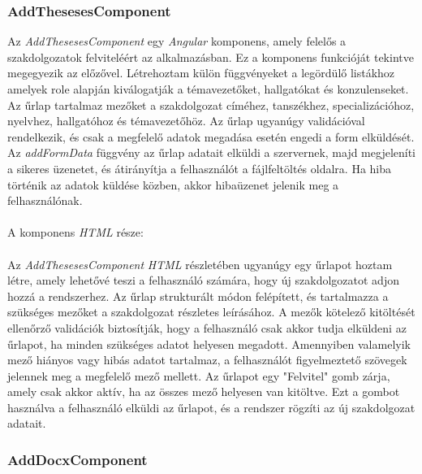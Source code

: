 \subsubsection{AddThesesesComponent}

Az \textit{AddThesesesComponent} egy \textit{Angular} komponens, amely felelős a szakdolgozatok felviteléért az alkalmazásban. Ez a komponens funkcióját tekintve megegyezik az előzővel. Létrehoztam külön függvényeket a legördülő listákhoz amelyek role alapján kiválogatják a témavezetőket, hallgatókat és konzulenseket.  Az űrlap tartalmaz mezőket a szakdolgozat címéhez, tanszékhez, specializációhoz, nyelvhez, hallgatóhoz és témavezetőhöz. Az űrlap ugyanúgy validációval rendelkezik, és csak a megfelelő adatok megadása esetén engedi a form elküldését. Az \textit{addFormData} függvény az űrlap adatait elküldi a szervernek, majd megjeleníti a sikeres üzenetet, és átirányítja a felhasználót a fájlfeltöltés oldalra. Ha hiba történik az adatok küldése közben, akkor hibaüzenet jelenik meg a felhasználónak.\\
\\
A komponens \textit{HTML} része:\\
\\
Az \textit{AddThesesesComponent} \textit{HTML} részletében ugyanúgy egy űrlapot hoztam létre, amely lehetővé teszi a felhasználó számára, hogy új szakdolgozatot adjon hozzá a rendszerhez. Az űrlap strukturált módon felépített, és tartalmazza a szükséges mezőket a szakdolgozat részletes leírásához. A mezők kötelező kitöltését ellenőrző validációk biztosítják, hogy a felhasználó csak akkor tudja elküldeni az űrlapot, ha minden szükséges adatot helyesen megadott. Amennyiben valamelyik mező hiányos vagy hibás adatot tartalmaz, a felhasználót figyelmeztető szövegek jelennek meg a megfelelő mező mellett. Az űrlapot egy "Felvitel" gomb zárja, amely csak akkor aktív, ha az összes mező helyesen van kitöltve. Ezt a gombot használva a felhasználó elküldi az űrlapot, és a rendszer rögzíti az új szakdolgozat adatait.

\subsubsection{AddDocxComponent}

